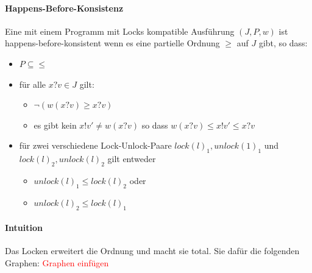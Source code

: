\documentclass[a4paper,10pt, oneside]{book}
\begin{document}
\paragraph{Happens-Before-Konsistenz}
Eine mit einem Programm mit Locks kompatible Ausführung $(J,P,w)$ ist happens-before-konsistent wenn es eine partielle Ordnung $\geq$ auf $J$ gibt, so dass:
\begin{itemize}
	\item $P \subseteq \leq$
	\item für alle $x?v \in J$ gilt:
	\begin{itemize}
		\item $\neg(w(x?v) \geq x?v)$
		\item es gibt kein $x!v' \not= w(x?v)$ so dass $w(x?v) \leq x!v' \leq x?v$
	\end{itemize}
	\item für zwei verschiedene Lock-Unlock-Paare $lock(l)_1, unlock(1)_1$ und $lock(l)_2, unlock(l)_2$ gilt entweder
	\begin{itemize}
		\item $unlock(l)_1 \leq lock(l)_2$ oder
		\item $unlock(l)_2 \leq lock(l)_1$
	\end{itemize}
\end{itemize}

\paragraph{Intuition}
Das Locken erweitert die Ordnung und macht sie total. Sie dafür die folgenden Graphen:
\textcolor{red}{Graphen einfügen}
\end{document}
